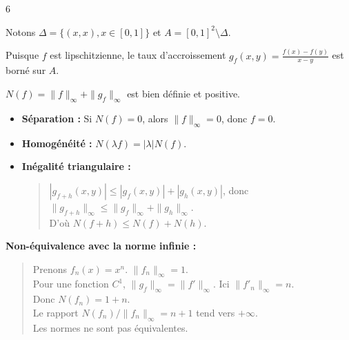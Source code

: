 \begin{correction}{6}

Notons $\Delta = \{(x,x), x \in [0,1]\}$ et $A = [0,1]^2 \setminus \Delta$.

Puisque $f$ est lipschitzienne, le taux d'accroissement $g_f(x,y) = \frac{f(x)-f(y)}{x-y}$ est borné sur $A$.

$N(f) = \|f\|_\infty + \|g_f\|_\infty$ est bien définie et positive.

\begin{itemize}
    \item \textbf{Séparation :} Si $N(f)=0$, alors $\|f\|_\infty = 0$, donc $f=0$.

    \item \textbf{Homogénéité :} $N(\lambda f) = |\lambda| N(f)$.

    \item \textbf{Inégalité triangulaire :} 
    \begin{quote}
        $|g_{f+h}(x,y)| \leqslant |g_f(x,y)| + |g_h(x,y)|$,
        donc $\|g_{f+h}\|_\infty \leqslant \|g_f\|_\infty + \|g_h\|_\infty$. \\
        D'où $N(f+h) \leqslant N(f) + N(h)$.
    \end{quote}
\end{itemize}

\textbf{Non-équivalence avec la norme infinie :}
\begin{quote}
    Prenons $f_n(x) = x^n$. $\|f_n\|_\infty = 1$. \\
    Pour une fonction $C^1$, $\|g_f\|_\infty = \|f'\|_\infty$. Ici $\|f'_n\|_\infty = n$. \\
    Donc $N(f_n) = 1 + n$. \\
    Le rapport $N(f_n) / \|f_n\|_\infty = n+1$ tend vers $+\infty$. \\
    Les normes ne sont pas équivalentes.
\end{quote}
\end{correction}

